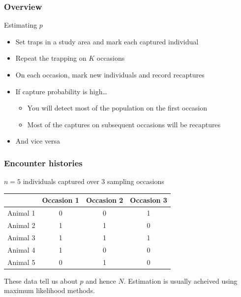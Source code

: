 \documentclass[color=usenames,dvipsnames]{beamer}\usepackage[]{graphicx}\usepackage[]{color}
\begin{document}
\begin{frame}
  \frametitle{Overview}
  \large
  {%
    Estimating $p$}
  \begin{itemize}[<+->]
    \normalsize
    \item Set traps in a study area and mark each captured individual
    \item Repeat the trapping on $K$ occasions
    \item On each occasion, mark new individuals and record recaptures
    \item If capture probability is high\dots
    \begin{itemize}
      \normalsize
      \item You will detect most of the population on the first
        occasion
      \item Most of the captures on subsequent occasions will be
        recaptures
    \end{itemize}
    \item And vice versa
  \end{itemize}
\end{frame}






\begin{frame}
  \frametitle{Encounter histories}
  {\centering \large $n=5$ individuals captured over 3 sampling occasions \par}
  \vspace{0.3cm}
  \begin{center}
    \small
    \begin{tabular}{lccc}
      \hline
      & Occasion 1 & Occasion 2 & Occasion 3 \\
      \hline
      Animal 1 & 0 & 0 & 1 \\
      Animal 2 & 1 & 1 & 0 \\
      Animal 3 & 1 & 1 & 1 \\
      Animal 4 & 1 & 0 & 0 \\
      Animal 5 & 0 & 1 & 0 \\
      \hline
    \end{tabular}
  \end{center}
  \pause
  \vfill
  \centering
  \large These data tell us about $p$ and hence $N$. Estimation is
  usually acheived using maximum likelihood methods.
\end{frame}
\end{document}
